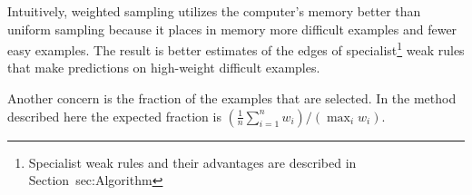 Intuitively, weighted sampling utilizes the computer's memory better
than uniform sampling because it places in memory more difficult
examples and fewer easy examples. The result is better estimates of
the edges of specialist\footnote{Specialist weak rules and their
  advantages are described in Section~{sec:Algorithm}} weak rules that
make predictions on high-weight difficult examples.


Another concern is the fraction of the examples that are selected. In
the method described here the expected fraction is $(\frac{1}{n}
\sum_{i=1}^n w_i)/(\max_i w_i)$.
